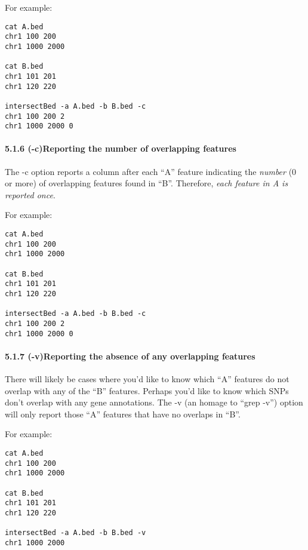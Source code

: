 \documentclass[letterpaper,10pt,english]{sphinxmanual}
\begin{document}
For example:

\begin{Verbatim}[commandchars=\\\{\}]
cat A.bed
chr1 100 200
chr1 1000 2000

cat B.bed
chr1 101 201
chr1 120 220

intersectBed -a A.bed -b B.bed -c
chr1 100 200 2
chr1 1000 2000 0
\end{Verbatim}


\paragraph{5.1.6 (-c)Reporting the number of overlapping features}
\label{content/intersectBed:id1}
The -c option reports a column after each ``A'' feature indicating the \emph{number} (0 or more) of overlapping
features found in ``B''. Therefore, \emph{each feature in A is reported once}.

For example:

\begin{Verbatim}[commandchars=\\\{\}]
cat A.bed
chr1 100 200
chr1 1000 2000

cat B.bed
chr1 101 201
chr1 120 220

intersectBed -a A.bed -b B.bed -c
chr1 100 200 2
chr1 1000 2000 0
\end{Verbatim}


\paragraph{5.1.7 (-v)Reporting the absence of any overlapping features}
\label{content/intersectBed:v-reporting-the-absence-of-any-overlapping-features}
There will likely be cases where you'd like to know which ``A'' features do not overlap with any of the
``B'' features. Perhaps you'd like to know which SNPs don't overlap with any gene annotations. The -v
(an homage to ``grep -v'') option will only report those ``A'' features that have no overlaps in ``B''.

For example:

\begin{Verbatim}[commandchars=\\\{\}]
cat A.bed
chr1 100 200
chr1 1000 2000

cat B.bed
chr1 101 201
chr1 120 220

intersectBed -a A.bed -b B.bed -v
chr1 1000 2000
\end{Verbatim}
\end{document}

